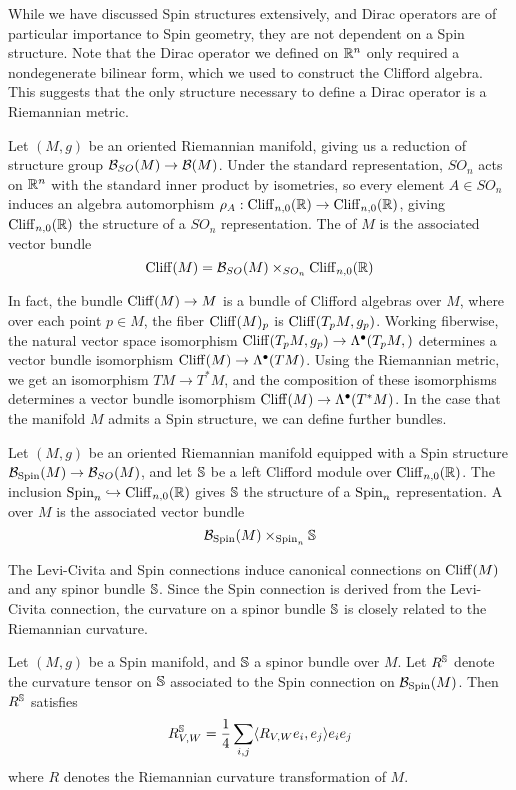 While we have discussed Spin structures extensively, and Dirac operators are
of particular importance to Spin geometry, they are not dependent on a Spin structure.
Note that the Dirac operator we defined on $\R^n$ only required a nondegenerate
bilinear form, which we used to construct the Clifford algebra. This suggests
that the only structure necessary to define a Dirac operator is a Riemannian metric.
%
\begin{defn}
Let $(M,g)$ be an oriented Riemannian manifold, giving us a reduction of structure
group $\B_{SO}(M) \to \B(M)$. Under the standard representation, $SO_n$ acts on $\R^n$
with the standard inner product by isometries, so every element $A \in SO_n$ induces
an algebra automorphism  $\rho_A : \Cliff_{n,0}(\R) \to \Cliff_{n,0}(\R)$, giving
$\Cliff_{n,0}(\R)$ the structure of a $SO_n$ representation. The 
of $M$ is the associated vector bundle
\[
\Cliff(M) = \B_{SO}(M) \times_{SO_n} \Cliff_{n,0}(\R)
\]
\end{defn}
%
In fact, the bundle $\Cliff(M) \to M$ is a bundle of Clifford algebras over $M$, where
over each point $p \in M$, the fiber $\Cliff(M)_p$ is $\Cliff(T_pM, g_p)$. Working
fiberwise, the natural vector space isomorphism
$\Cliff(T_pM, g_p) \to \Lambda^\bullet(T_pM,)$ determines  a vector bundle isomorphism
$\Cliff(M) \to \Lambda^\bullet(TM)$. Using the Riemannian metric, we get an isomorphism
$TM \to T^*M$, and the composition of these isomorphisms determines a vector bundle
isomorphism $\Cliff(M) \to \Lambda^\bullet(T^*M)$. In the case that the manifold
$M$ admits a Spin structure, we can define further bundles.
%
\begin{defn}
Let $(M,g)$ be an oriented Riemannian manifold equipped with a Spin structure
$\B_{\Spin}(M) \to \B_{SO}(M)$, and let $\S$ be a left Clifford module over
$\Cliff_{n,0}(\R)$. The inclusion $\Spin_n \hookrightarrow \Cliff_{n,0}(\R)$ gives $\S$
the structure of a $\Spin_n$ representation. A  over $M$ is the
associated vector bundle
\[
\B_\Spin(M) \times_{\Spin_n} \S
\]
\end{defn}
%
The Levi-Civita and Spin connections induce canonical connections on $\Cliff(M)$ and
any spinor bundle $\S$. Since the Spin connection is derived from the Levi-Civita
connection, the curvature on a spinor bundle $\S$ is closely related to the
Riemannian curvature.
%
\begin{prop}
Let $(M,g)$ be a Spin manifold, and $\S$ a spinor bundle over $M$. Let $R^\S$
denote the curvature tensor on $\S$ associated to the Spin connection on $\B_{\Spin}(M)$.
Then $R^\S$ satisfies
\[
R^\S_{V,W} = \frac{1}{4}\sum_{i, j}\langle R_{V,W}e_i, e_j \rangle e_ie_j
\]
where $R$ denotes the Riemannian curvature transformation of $M$.
\end{prop}
